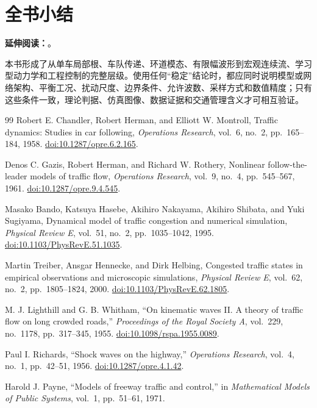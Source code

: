 \documentclass[11pt,a4paper,openany]{book}
\numberwithin{equation}{chapter}
\numberwithin{figure}{chapter}
\numberwithin{table}{chapter}
\newcommand{\sectionstudy}[3]{%
  \begin{tcolorbox}[studybox,title=\textbf{本节思考与延伸阅读}]
  \small
  \begin{enumerate}[leftmargin=1.65em,itemsep=0.1em,topsep=0.1em,parsep=0pt]
    \csuse{studyquestions#1}{#2}
  \end{enumerate}
  \noindent\textbf{延伸阅读：}\cite{#3}。
  \end{tcolorbox}}
\begin{document}
\section{全书小结}
\sectionstudy{synthesis}{全书小结}{helbing2001,treiberkesting2013,ororsz2010}

本书形成了从单车局部根、车队传递、环道模态、有限幅波形到宏观连续流、学习型动力学和工程控制的完整层级。使用任何“稳定”结论时，都应同时说明模型或网络架构、平衡工况、扰动尺度、边界条件、允许波数、采样方式和数值精度；只有这些条件一致，理论判据、仿真图像、数据证据和交通管理含义才可相互验证。

\clearpage
\begin{thebibliography}{99}
Robert E. Chandler, Robert Herman, and Elliott W. Montroll,
{Traffic dynamics: Studies in car following},
\emph{Operations Research}, vol.~6, no.~2, pp.~165--184, 1958.
\href{https://doi.org/10.1287/opre.6.2.165}{doi:10.1287/opre.6.2.165}.

Denos C. Gazis, Robert Herman, and Richard W. Rothery,
{Nonlinear follow-the-leader models of traffic flow},
\emph{Operations Research}, vol.~9, no.~4, pp.~545--567, 1961.
\href{https://doi.org/10.1287/opre.9.4.545}{doi:10.1287/opre.9.4.545}.

Masako Bando, Katsuya Hasebe, Akihiro Nakayama, Akihiro Shibata, and Yuki Sugiyama,
{Dynamical model of traffic congestion and numerical simulation},
\emph{Physical Review E}, vol.~51, no.~2, pp.~1035--1042, 1995.
\href{https://doi.org/10.1103/PhysRevE.51.1035}{doi:10.1103/PhysRevE.51.1035}.

Martin Treiber, Ansgar Hennecke, and Dirk Helbing,
{Congested traffic states in empirical observations and microscopic simulations},
\emph{Physical Review E}, vol.~62, no.~2, pp.~1805--1824, 2000.
\href{https://doi.org/10.1103/PhysRevE.62.1805}{doi:10.1103/PhysRevE.62.1805}.

M. J. Lighthill and G. B. Whitham,
``On kinematic waves II. A theory of traffic flow on long crowded roads,''
\emph{Proceedings of the Royal Society A}, vol.~229, no.~1178, pp.~317--345, 1955.
\href{https://doi.org/10.1098/rspa.1955.0089}{doi:10.1098/rspa.1955.0089}.

Paul I. Richards,
``Shock waves on the highway,''
\emph{Operations Research}, vol.~4, no.~1, pp.~42--51, 1956.
\href{https://doi.org/10.1287/opre.4.1.42}{doi:10.1287/opre.4.1.42}.

Harold J. Payne,
``Models of freeway traffic and control,''
in \emph{Mathematical Models of Public Systems}, vol.~1, pp.~51--61, 1971.


\end{thebibliography}
\end{document}
